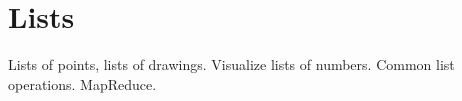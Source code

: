 
\section{Lists}
Lists of points, lists of drawings. Visualize lists of numbers. Common list operations. MapReduce.
